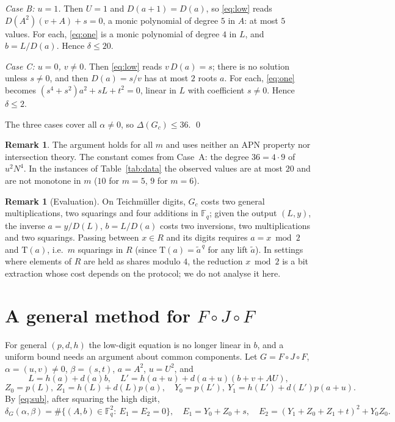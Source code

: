 \documentclass[11pt]{amsart}
\theoremstyle{definition}
\newtheorem{remark}[theorem]{Remark}
\newcommand{\Fq}{\mathbb{F}_q}
\newcommand{\T}{\mathrm{T}}
\newcommand{\diff}{\delta}
\begin{document}
\emph{Case B: $u=1$.} Then $U=1$ and $D(a+1)=D(a)$, so \eqref{eq:low} reads $D(A^2)(v+A)+s=0$, a monic polynomial of degree $5$ in
$A$: at most $5$ values. For each, \eqref{eq:one} is a monic polynomial of degree $4$ in $L$, and $b=L/D(a)$. Hence $\diff\le20$.

\emph{Case C: $u=0$, $v\ne0$.} Then \eqref{eq:low} reads $v\,D(a)=s$; there is no solution unless $s\ne0$, and then $D(a)=s/v$ has at most
$2$ roots $a$. For each, \eqref{eq:one} becomes $(s^4+s^2)a^2+sL+t^2=0$, linear in $L$ with coefficient $s\ne0$. Hence $\diff\le2$.

The three cases cover all $\alpha\ne0$, so $\Delta(G_c)\le36$. \qed

\begin{remark}
The argument holds for all $m$ and uses neither an APN property nor intersection theory. The constant comes from Case~A: the
degree $36=4\cdot9$ of $u^2N^4$. In the instances of Table~\ref{tab:data} the observed values are at most $20$ and are not monotone
in $m$ ($10$ for $m=5$, $9$ for $m=6$).
\end{remark}

\begin{remark}[Evaluation]
On Teichm\"uller digits, $G_c$ costs two general multiplications, two squarings and four additions in $\Fq$; given the output
$(L,y)$, the inverse $a=y/D(L)$, $b=L/D(a)$ costs two inversions, two multiplications and two squarings. Passing between $x\in R$ and its digits
requires $a=x\bmod 2$ and $\T(a)$, i.e.\ $m$ squarings in $R$ (since $\T(a)=\tilde a^{\,q}$ for any lift $\tilde a$). In settings
where elements of $R$ are held as shares modulo $4$, the reduction $x\bmod2$ is a bit extraction whose cost depends on the protocol;
we do not analyse it here.
\end{remark}

\section{\texorpdfstring{A general method for $F\circ J\circ F$}{A general method for FJF}}

For general $(p,d,h)$ the low-digit equation is no longer linear in $b$, and a uniform bound needs an argument about common
components. Let $G=F\circ J\circ F$, $\alpha=(u,v)\ne0$, $\beta=(s,t)$, $a=A^2$, $u=U^2$, and
\[
L=h(a)+d(a)b,\quad L'=h(a+u)+d(a+u)(b+v+AU),
\]
\[
Z_0=p(L),\ Z_1=h(L)+d(L)p(a),\quad Y_0=p(L'),\ Y_1=h(L')+d(L')p(a+u).
\]
By \eqref{eq:sub}, after squaring the high digit,
\begin{equation}\label{eq:E}
\diff_G(\alpha,\beta)=\#\{(A,b)\in\Fq^2:\ E_1=E_2=0\},\quad
E_1=Y_0+Z_0+s,\quad E_2=(Y_1+Z_0+Z_1+t)^2+Y_0Z_0 .
\end{equation}
\end{document}
